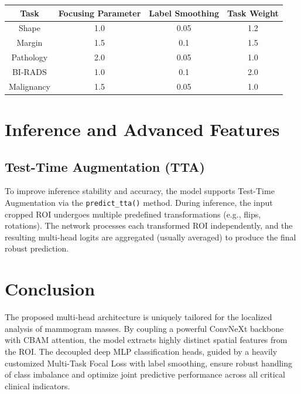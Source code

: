 \documentclass[11pt,a4paper]{article}
\begin{document}
\begin{center}
    \label{table:hyperparams}
    \begin{tabular}{|c|c|c|c|}
        \hline
        Task       & Focusing Parameter & Label Smoothing & Task Weight \\ \hline
        Shape      & 1.0                & 0.05            & 1.2         \\ \hline
        Margin     & 1.5                & 0.1             & 1.5         \\ \hline
        Pathology  & 2.0                & 0.05            & 1.0         \\ \hline
        BI-RADS    & 1.0                & 0.1             & 2.0         \\ \hline
        Malignancy & 1.5                & 0.05            & 1.0         \\ \hline
    \end{tabular}
\end{center}

\section{Inference and Advanced Features}
\subsection{Test-Time Augmentation (TTA)}
To improve inference stability and accuracy, the model supports Test-Time Augmentation via the \texttt{predict\_tta()} method. During inference, the input cropped ROI undergoes multiple predefined transformations (e.g., flips, rotations). The network processes each transformed ROI independently, and the resulting multi-head logits are aggregated (usually averaged) to produce the final robust prediction.

\section{Conclusion}
The proposed multi-head architecture is uniquely tailored for the localized analysis of mammogram masses. By coupling a powerful ConvNeXt backbone with CBAM attention, the model extracts highly distinct spatial features from the ROI. The decoupled deep MLP classification heads, guided by a heavily customized Multi-Task Focal Loss with label smoothing, ensure robust handling of class imbalance and optimize joint predictive performance across all critical clinical indicators.
\end{document}
